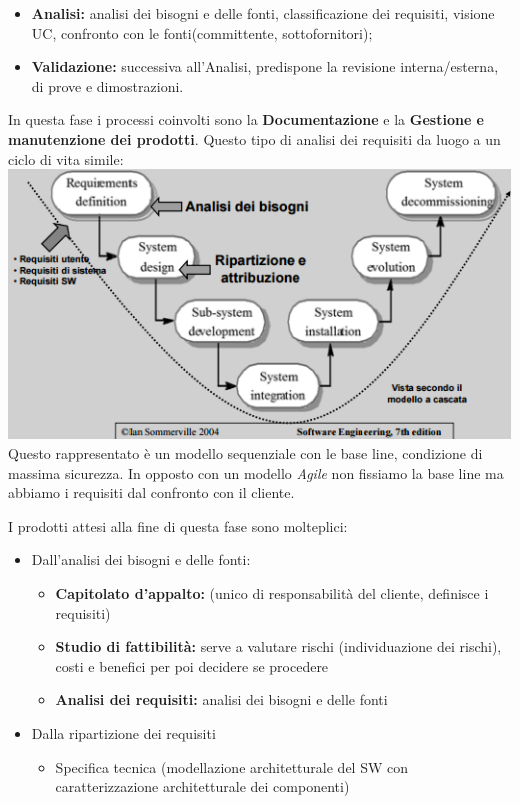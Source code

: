 \begin{itemize}

	\item \textbf{Analisi:} analisi dei bisogni e delle fonti, classificazione dei requisiti, visione UC, confronto con le fonti(committente, sottofornitori);
	\item \textbf{Validazione:} successiva all'Analisi, predispone la revisione interna/esterna, di prove e dimostrazioni.

\end{itemize}

In questa fase i processi coinvolti sono la \textbf{Documentazione} e la \textbf{Gestione e manutenzione dei prodotti}. Questo tipo di analisi dei requisiti da luogo a un ciclo di vita simile:\\
\includegraphics[width=0.75\columnwidth]{img1}
\\
Questo rappresentato è un modello sequenziale con le base line, condizione di massima sicurezza. In opposto con un modello \textit{Agile} non fissiamo la base line ma abbiamo i requisiti dal confronto con il cliente.

I prodotti attesi alla fine di questa fase sono molteplici:

\begin{itemize}
	\item Dall'analisi dei bisogni e delle fonti:
	\begin{itemize}
		\item \textbf{Capitolato d'appalto:} (unico di responsabilità del cliente, definisce i requisiti)
		\item \textbf{Studio di fattibilità:} serve a valutare rischi (individuazione dei rischi), costi e benefici per poi decidere se procedere
		\item \textbf{Analisi dei requisiti:} analisi dei bisogni e delle fonti
	\end{itemize}
	\item Dalla ripartizione dei requisiti
	\begin{itemize}
		\item Specifica tecnica (modellazione architetturale del SW con caratterizzazione architetturale dei componenti)
	\end{itemize}
\end{itemize}

